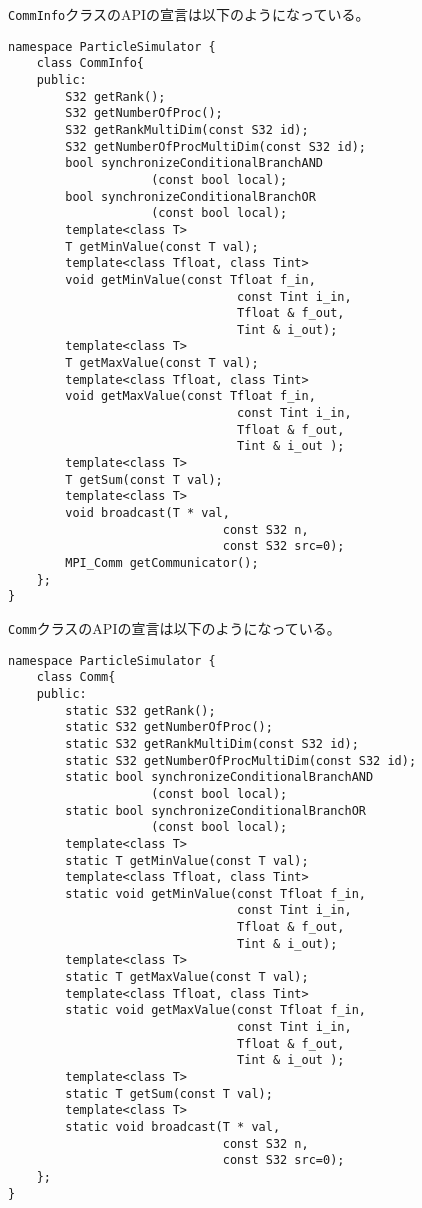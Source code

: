 {\tt CommInfo}クラスのAPIの宣言は以下のようになっている。
\begin{lstlisting}[caption=CommunicationInformation]
namespace ParticleSimulator {
    class CommInfo{
    public:
        S32 getRank();
        S32 getNumberOfProc();
        S32 getRankMultiDim(const S32 id);
        S32 getNumberOfProcMultiDim(const S32 id);
        bool synchronizeConditionalBranchAND
                    (const bool local);
        bool synchronizeConditionalBranchOR
                    (const bool local);
        template<class T>
        T getMinValue(const T val);
        template<class Tfloat, class Tint>
        void getMinValue(const Tfloat f_in,
                                const Tint i_in,
                                Tfloat & f_out,
                                Tint & i_out);
        template<class T>
        T getMaxValue(const T val);
        template<class Tfloat, class Tint>
        void getMaxValue(const Tfloat f_in,
                                const Tint i_in,
                                Tfloat & f_out,
                                Tint & i_out );
        template<class T>
        T getSum(const T val);
        template<class T>
        void broadcast(T * val,
                              const S32 n,
                              const S32 src=0);
        MPI_Comm getCommunicator();
    };
}
\end{lstlisting}


{\tt Comm}クラスのAPIの宣言は以下のようになっている。
\begin{lstlisting}[caption=Communication]
namespace ParticleSimulator {
    class Comm{
    public:
        static S32 getRank();
        static S32 getNumberOfProc();
        static S32 getRankMultiDim(const S32 id);
        static S32 getNumberOfProcMultiDim(const S32 id);
        static bool synchronizeConditionalBranchAND
                    (const bool local);
        static bool synchronizeConditionalBranchOR
                    (const bool local);
        template<class T>
        static T getMinValue(const T val);
        template<class Tfloat, class Tint>
        static void getMinValue(const Tfloat f_in,
                                const Tint i_in,
                                Tfloat & f_out,
                                Tint & i_out);
        template<class T>
        static T getMaxValue(const T val);
        template<class Tfloat, class Tint>
        static void getMaxValue(const Tfloat f_in,
                                const Tint i_in,
                                Tfloat & f_out,
                                Tint & i_out );
        template<class T>
        static T getSum(const T val);
        template<class T>
        static void broadcast(T * val,
                              const S32 n,
                              const S32 src=0);
    };
}
\end{lstlisting}

